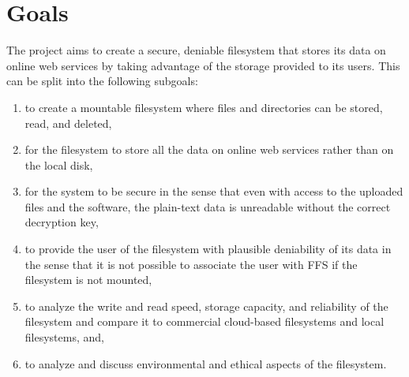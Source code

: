 
\section{Goals}


The project aims to create a secure, deniable filesystem that stores its data on online web services by taking advantage of the storage provided to its users. This can be split into the following subgoals:
\begin{enumerate}
\item to create a mountable filesystem where files and directories can be stored, read, and deleted,
\item for the filesystem to store all the data on online web services rather than on the local disk,
\item for the system to be secure in the sense that even with access to the uploaded files and the software, the plain-text data is unreadable without the correct decryption key, 
\item to provide the user of the filesystem with plausible deniability of its data in the sense that it is not possible to associate the user with \gls{FFS} if the filesystem is not mounted,
\item to analyze the write and read speed, storage capacity, and reliability of the filesystem and compare it to commercial cloud-based filesystems and local filesystems, and,
\item to analyze and discuss environmental and ethical aspects of the filesystem.
\end{enumerate}

